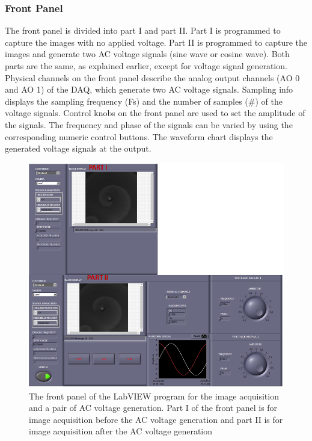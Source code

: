 \documentclass[journal=jacsat,manuscript=article]{achemso}
\begin{document}
\subsubsection{Front Panel}
The front panel is divided into part I and part II. Part I is
programmed to capture the images with no applied voltage.  Part II is
programmed to capture the images and generate two AC voltage signals
(sine wave or cosine wave). Both parts are the same, as explained
earlier, except for voltage signal generation. Physical channels on
the front panel describe the analog output channels (AO 0 and AO 1) of
the DAQ, which generate two AC voltage signals. Sampling info displays
the sampling frequency (Fs) and the number of samples (\#) of the
voltage signals. Control knobs on the front panel are used to set the
amplitude of the signals. The frequency and phase of the signals can
be varied by using the corresponding numeric control buttons. The
waveform chart displays the generated voltage signals at the output.
\begin{figure}[H]
    \centering
    \includegraphics[width=\linewidth]{polarised.png}
    \caption{The front panel of the LabVIEW program for the image
      acquisition and a pair of AC voltage generation. Part I of the
      front panel is for image acquisition before the AC voltage
      generation and part II is for image acquisition after the AC
      voltage generation}
    \label{fig:ex7}
\end{figure}
\end{document}
